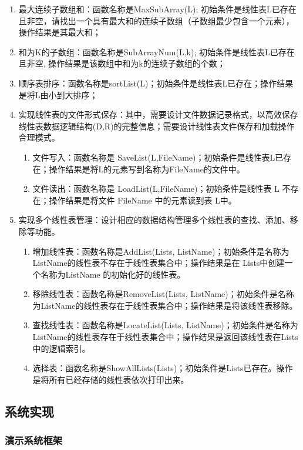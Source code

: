 \documentclass[supercite]{Experimental_Report}
\newcommand{\whiteding}[1]{\ding{\numexpr171+#1\relax}}
\theoremstyle{definition}
\begin{document}
\begin{enumerate}
    \item 最大连续子数组和：函数名称是MaxSubArray(L); 初始条件是线性表L已存在且非空，请找出一个具有最大和的连续子数组（子数组最少包含一个元素），操作结果是其最大和；
    \item 和为K的子数组：函数名称是SubArrayNum(L,k); 初始条件是线性表L已存在且非空, 操作结果是该数组中和为k的连续子数组的个数；
    \item 顺序表排序：函数名称是sortList(L)；初始条件是线性表L已存在；操作结果是将L由小到大排序；
    \item 实现线性表的文件形式保存：其中，\whiteding{1}需要设计文件数据记录格式，以高效保存线性表数据逻辑结构(D,{R})的完整信息；\whiteding{2}需要设计线性表文件保存和加载操作合理模式。
	\begin{enumerate}
	\item 文件写入：函数名称是 SaveList(L,FileName)；初始条件是线性表L已存在；操作结果是将L的元素写到名称为FileName的文件中。
	\item 文件读出：函数名称是 LoadList(L,FileName)；初始条件是线性表 L 不存在；操作结果是将文件 FileName 中的元素读到表 L中。
	\end{enumerate}
    \item 实现多个线性表管理：设计相应的数据结构管理多个线性表的查找、添加、移除等功能。
	\begin{enumerate}
	\item 增加线性表：函数名称是AddList(Lists, ListName)；初始条件是名称为ListName的线性表不存在于线性表集合中；操作结果是在 Lists中创建一个名称为ListName 的初始化好的线性表。
	\item 移除线性表：函数名称是RemoveList(Lists, ListName)；初始条件是名称为ListName的线性表存在于线性表集合中；操作结果是将该线性表移除。
	\item 查找线性表：函数名称是LocateList(Lists, ListName)；初始条件是名称为ListName的线性表存在于线性表集合中；操作结果是返回该线性表在Lists中的逻辑索引。
	\item 选择表：函数名称是ShowAllLists(Lists)；初始条件是Lists已存在。操作是将所有已经存储的线性表依次打印出来。
	\end{enumerate}
\end{enumerate}

\subsection{系统实现}

\subsubsection{演示系统框架}
\end{document}
